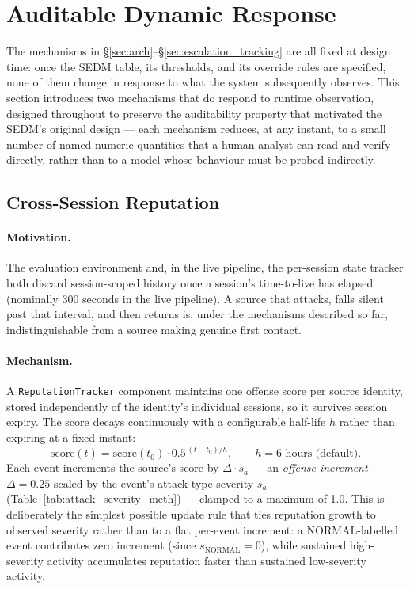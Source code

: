 \section{Auditable Dynamic Response}
\label{sec:dynamic_response}

The mechanisms in \S\ref{sec:arch}--\S\ref{sec:escalation_tracking} are all
fixed at design time: once the SEDM table, its thresholds, and its override
rules are specified, none of them change in response to what the system
subsequently observes. This section introduces two mechanisms that do
respond to runtime observation, designed throughout to preserve the
auditability property that motivated the SEDM's original design — each
mechanism reduces, at any instant, to a small number of named numeric
quantities that a human analyst can read and verify directly, rather than
to a model whose behaviour must be probed indirectly.

\subsection{Cross-Session Reputation}
\label{sec:reputation}

\paragraph{Motivation.}
The evaluation environment and, in the live pipeline, the per-session state
tracker both discard session-scoped history once a session's time-to-live
has elapsed (nominally 300 seconds in the live pipeline). A source that
attacks, falls silent past that interval, and then returns is, under the
mechanisms described so far, indistinguishable from a source making genuine
first contact.

\paragraph{Mechanism.}
A \texttt{ReputationTracker} component maintains one offense score per
source identity, stored independently of the identity's individual
sessions, so it survives session expiry. The score decays continuously with
a configurable half-life $h$ rather than expiring at a fixed instant:
%
\begin{equation}
  \text{score}(t) = \text{score}(t_0) \cdot 0.5^{\,(t - t_0)/h}, \qquad
  h = 6 \text{ hours (default)}.
  \label{eq:reputation_decay}
\end{equation}
%
Each event increments the source's score by $\Delta \cdot s_a$ — an
\emph{offense increment} $\Delta = 0.25$ scaled by the event's attack-type
severity $s_a$ (Table~\ref{tab:attack_severity_meth}) — clamped to a
maximum of 1.0. This is deliberately the simplest possible update rule that
ties reputation growth to observed severity rather than to a flat per-event
increment: a NORMAL-labelled event contributes zero increment (since
$s_{\text{NORMAL}} = 0$), while sustained high-severity activity accumulates
reputation faster than sustained low-severity activity.

